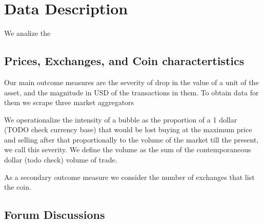 \section{Data Description}

We analize the 

\subsection{Prices, Exchanges, and Coin charactertistics}

Our main outcome measures are the severity of drop in the value of a unit of the asset, and the magnitude in USD of the transactions in them.
To obtain data for them we scrape three market aggregators 

We operationalize the intensity of a bubble as the proportion of a 1 dollar (TODO check currency base) that would be lost buying at the maximum price and selling after that proportionally to the volume of the market till the present, we call this severity.
We define the volume as the sum of the contemporaneous dollar (todo check) volume of trade.

As a secondary outcome measure we consider the number of exchanges that list the coin.


\subsection{Forum Discussions}


